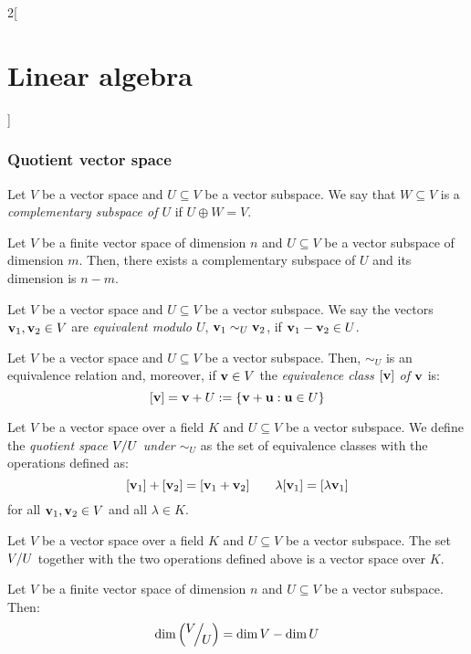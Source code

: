 \documentclass[../../../main.tex]{subfiles}
\begin{document}
\begin{multicols}{2}[\section{Linear algebra}]
  \subsubsection*{Quotient vector space}
  \begin{definition}
    Let $V$ be a vector space and $U\subseteq V$ be a vector subspace. We say that $W\subseteq V$ is a \textit{complementary subspace of $U$} if $U\oplus W=V$.
  \end{definition}
  \begin{definition}
    Let $V$ be a finite vector space of dimension $n$ and $U\subseteq V$ be a vector subspace of dimension $m$. Then, there exists a complementary subspace of $U$ and its dimension is $n-m$.
  \end{definition}
  \begin{definition}
    Let $V$ be a vector space and $U\subseteq V$ be a vector subspace. We say the vectors $\vb{v}_1,\vb{v}_2\in V$ are \textit{equivalent modulo $U$}, $\vb{v}_1\sim_U\vb{v}_2$, if $\vb{v}_1-\vb{v}_2\in U$.
  \end{definition}
  \begin{lemma}
    Let $V$ be a vector space and $U\subseteq V$ be a vector subspace. Then, $\sim_U$ is an equivalence relation and, moreover, if $\vb{v}\in V$ the \textit{equivalence class $[\vb{v}]$ of $\vb{v}$} is: $$[\vb{v}]=\vb{v}+U:=\{\vb{v}+\vb{u}:\vb{u}\in U\}$$
  \end{lemma}
  \begin{definition}
    Let $V$ be a vector space over a field $K$ and $U\subseteq V$ be a vector subspace. We define the \textit{quotient space $\quot{V}{U}$ under $\sim_U$} as the set of equivalence classes with the operations defined as:
    $$[\vb{v}_1]+[\vb{v}_2]=[\vb{v}_1+\vb{v}_2]\qquad \lambda[\vb{v}_1]=[\lambda\vb{v}_1]$$
    for all $\vb{v}_1,\vb{v}_2\in V$ and all $\lambda\in K$.
  \end{definition}
  \begin{prop}
    Let $V$ be a vector space over a field $K$ and $U\subseteq V$ be a vector subspace. The set $\quot{V}{U}$ together with the two operations defined above is a vector space over $K$.
  \end{prop}
  \begin{prop}
    Let $V$ be a finite vector space of dimension $n$ and $U\subseteq V$ be a vector subspace. Then: $$\dim\left(\quot{V}{U}\right)=\dim V-\dim U$$
  \end{prop}

\end{multicols}
\end{document}
